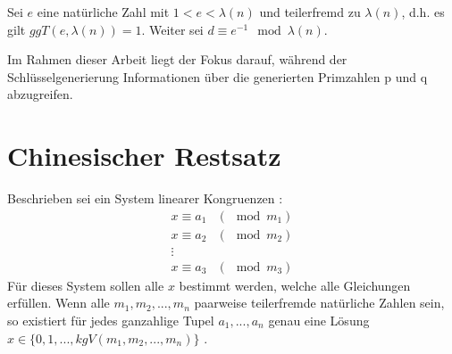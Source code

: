 Sei $e$ eine natürliche Zahl mit $1<e<\lambda(n)$ und teilerfremd zu $\lambda(n)$, d.h. es gilt $ggT(e,\lambda(n)) = 1$. Weiter sei $d \equiv e^{-1} \mod \lambda(n)$.

Im Rahmen dieser Arbeit liegt der Fokus darauf, während der Schlüsselgenerierung Informationen über die generierten Primzahlen p und q abzugreifen.










\section{Chinesischer Restsatz}
\label{chinese_remainder}

Beschrieben sei ein System linearer Kongruenzen \cite{CRTref}:
\begin{align*}
x \equiv a_1 &(\mod m_1)\\
x \equiv a_2 &(\mod m_2)\\
\vdots\\
x \equiv a_3 &(\mod m_3)
\end{align*}
Für dieses System sollen alle $x$ bestimmt werden, welche alle Gleichungen erfüllen.
Wenn alle $m_1,m_2,...,m_n$ paarweise teilerfremde natürliche Zahlen sein, so existiert für jedes ganzahlige Tupel $a_1, ..., a_n$ genau eine Lösung $x \in \{0,1,...,kgV(m_1,m_2,...,m_n)\}$ \cite{CRTwiki}.

